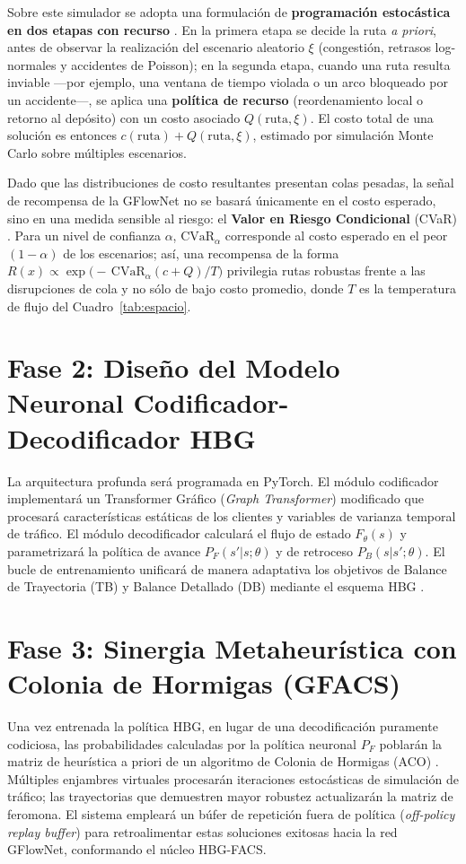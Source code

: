 \documentclass[12pt]{report}
\begin{document}
Sobre este simulador se adopta una formulaci\'on de \textbf{programaci\'on estoc\'astica en dos etapas con recurso} \cite{Gendreau1996Stochastic}. En la primera etapa se decide la ruta \emph{a priori}, antes de observar la realizaci\'on del escenario aleatorio $\xi$ (congesti\'on, retrasos log-normales y accidentes de Poisson); en la segunda etapa, cuando una ruta resulta inviable ---por ejemplo, una ventana de tiempo violada o un arco bloqueado por un accidente---, se aplica una \textbf{pol\'itica de recurso} (reordenamiento local o retorno al dep\'osito) con un costo asociado $Q(\text{ruta},\xi)$. El costo total de una soluci\'on es entonces $c(\text{ruta}) + Q(\text{ruta},\xi)$, estimado por simulaci\'on Monte Carlo sobre m\'ultiples escenarios.

Dado que las distribuciones de costo resultantes presentan colas pesadas, la se\~nal de recompensa de la GFlowNet no se basar\'a \'unicamente en el costo esperado, sino en una medida sensible al riesgo: el \textbf{Valor en Riesgo Condicional} (CVaR) \cite{Rockafellar2000CVaR}. Para un nivel de confianza $\alpha$, $\mathrm{CVaR}_{\alpha}$ corresponde al costo esperado en el peor $(1-\alpha)$ de los escenarios; as\'i, una recompensa de la forma $R(x) \propto \exp\!\big(-\,\mathrm{CVaR}_{\alpha}(c+Q)/T\big)$ privilegia rutas robustas frente a las disrupciones de cola y no s\'olo de bajo costo promedio, donde $T$ es la temperatura de flujo del Cuadro~\ref{tab:espacio}.

\section*{Fase 2: Dise\~no del Modelo Neuronal Codificador-Decodificador HBG}
La arquitectura profunda ser\'a programada en PyTorch. El m\'odulo codificador implementar\'a un Transformer Gr\'afico (\textit{Graph Transformer}) modificado que procesar\'a caracter\'isticas est\'aticas de los clientes y variables de varianza temporal de tr\'afico. El m\'odulo decodificador calcular\'a el flujo de estado $F_\theta(s)$ y parametrizar\'a la pol\'itica de avance $P_F(s'|s; \theta)$ y de retroceso $P_B(s|s'; \theta)$. El bucle de entrenamiento unificar\'a de manera adaptativa los objetivos de Balance de Trayectoria (TB) y Balance Detallado (DB) mediante el esquema HBG \cite{Zhang2025Hybrid}.

\section*{Fase 3: Sinergia Metaheur\'istica con Colonia de Hormigas (GFACS)}
Una vez entrenada la pol\'itica HBG, en lugar de una decodificaci\'on puramente codiciosa, las probabilidades calculadas por la pol\'itica neuronal $P_F$ poblar\'an la matriz de heur\'istica a priori de un algoritmo de Colonia de Hormigas (ACO) \cite{Kim2024GFACS}. M\'ultiples enjambres virtuales procesar\'an iteraciones estoc\'asticas de simulaci\'on de tr\'afico; las trayectorias que demuestren mayor robustez actualizar\'an la matriz de feromona. El sistema emplear\'a un b\'ufer de repetici\'on fuera de pol\'itica (\textit{off-policy replay buffer}) para retroalimentar estas soluciones exitosas hacia la red GFlowNet, conformando el n\'ucleo HBG-FACS.
\end{document}
